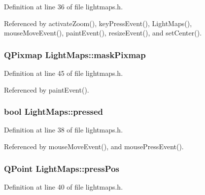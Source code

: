Definition at line 36 of file lightmaps.\-h.



Referenced by activate\-Zoom(), key\-Press\-Event(), Light\-Maps(), mouse\-Move\-Event(), paint\-Event(), resize\-Event(), and set\-Center().

\hypertarget{classLightMaps_a3a24ed88ec215d755ab8a2255b61ebf0}{
\subsubsection[{mask\-Pixmap}]{\setlength{\rightskip}{0pt plus 5cm}Q\-Pixmap Light\-Maps\-::mask\-Pixmap\hspace{0.3cm}{\ttfamily [private]}}}\label{classLightMaps_a3a24ed88ec215d755ab8a2255b61ebf0}


Definition at line 45 of file lightmaps.\-h.



Referenced by paint\-Event().

\hypertarget{classLightMaps_a3de175af7a5611709dd46895b5b2baf7}{
\subsubsection[{pressed}]{\setlength{\rightskip}{0pt plus 5cm}bool Light\-Maps\-::pressed\hspace{0.3cm}{\ttfamily [private]}}}\label{classLightMaps_a3de175af7a5611709dd46895b5b2baf7}


Definition at line 38 of file lightmaps.\-h.



Referenced by mouse\-Move\-Event(), and mouse\-Press\-Event().

\hypertarget{classLightMaps_a938551c74aa20bfb6896a46ea1437c79}{
\subsubsection[{press\-Pos}]{\setlength{\rightskip}{0pt plus 5cm}Q\-Point Light\-Maps\-::press\-Pos\hspace{0.3cm}{\ttfamily [private]}}}\label{classLightMaps_a938551c74aa20bfb6896a46ea1437c79}


Definition at line 40 of file lightmaps.\-h.



